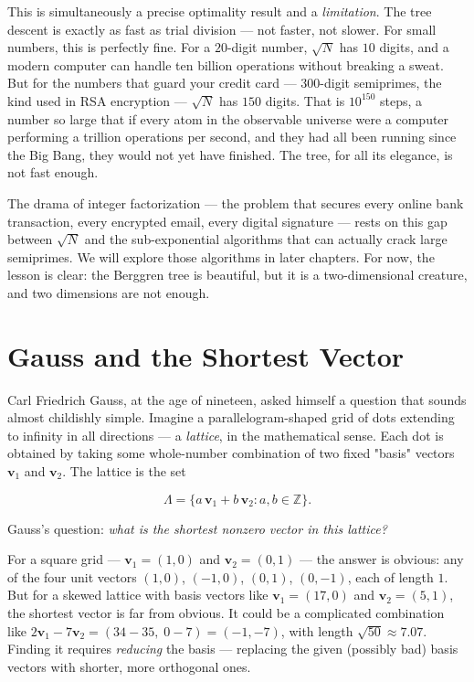 \documentclass[11pt,twoside,openright]{book}
\theoremstyle{definition}
\theoremstyle{remark}
\begin{document}
This is simultaneously a precise optimality result and a \textit{limitation}. The tree descent is exactly as fast as trial division --- not faster, not slower. For small numbers, this is perfectly fine. For a $20$-digit number, $\sqrt{N}$ has $10$ digits, and a modern computer can handle ten billion operations without breaking a sweat. But for the numbers that guard your credit card --- $300$-digit semiprimes, the kind used in RSA encryption --- $\sqrt{N}$ has $150$ digits. That is $10^{150}$ steps, a number so large that if every atom in the observable universe were a computer performing a trillion operations per second, and they had all been running since the Big Bang, they would not yet have finished. The tree, for all its elegance, is not fast enough.


The drama of integer factorization --- the problem that secures every online bank transaction, every encrypted email, every digital signature --- rests on this gap between $\sqrt{N}$ and the sub-exponential algorithms that can actually crack large semiprimes. We will explore those algorithms in later chapters. For now, the lesson is clear: the Berggren tree is beautiful, but it is a two-dimensional creature, and two dimensions are not enough.


\section{Gauss and the Shortest Vector}

Carl Friedrich Gauss, at the age of nineteen, asked himself a question that sounds almost childishly simple. Imagine a parallelogram-shaped grid of dots extending to infinity in all directions --- a \textit{lattice}, in the mathematical sense. Each dot is obtained by taking some whole-number combination of two fixed "basis" vectors $\mathbf{v}_1$ and $\mathbf{v}_2$. The lattice is the set

\[\Lambda = \{a\,\mathbf{v}_1 + b\,\mathbf{v}_2 : a, b \in \mathbb{Z}\}.\]

Gauss's question: \textit{what is the shortest nonzero vector in this lattice?}

For a square grid --- $\mathbf{v}_1 = (1, 0)$ and $\mathbf{v}_2 = (0, 1)$ --- the answer is obvious: any of the four unit vectors $(1,0)$, $(-1,0)$, $(0,1)$, $(0,-1)$, each of length $1$. But for a skewed lattice with basis vectors like $\mathbf{v}_1 = (17, 0)$ and $\mathbf{v}_2 = (5, 1)$, the shortest vector is far from obvious. It could be a complicated combination like $2\mathbf{v}_1 - 7\mathbf{v}_2 = (34 - 35,\; 0 - 7) = (-1, -7)$, with length $\sqrt{50} \approx 7.07$. Finding it requires \textit{reducing} the basis --- replacing the given (possibly bad) basis vectors with shorter, more orthogonal ones.
\end{document}
